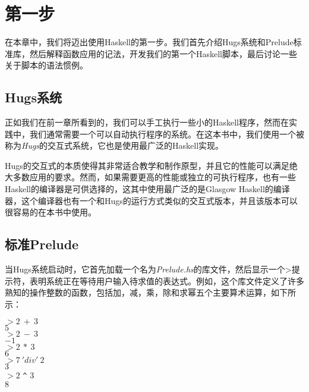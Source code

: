 \chapter{第一步}

在本章中，我们将迈出使用Haskell的第一步。我们首先介绍Hugs系统和Prelude标准库，然后解释函数应用的记法，开发我们的第一个Haskell脚本，最后讨论一些关于脚本的语法惯例。

\section{Hugs系统}
正如我们在前一章所看到的，我们可以手工执行一些小的Haskell程序，然而在实践中，我们通常需要一个可以自动执行程序的系统。在这本书中，我们使用一个被称为\textit{Hugs}的交互式系统，它也是使用最广泛的Haskell实现。

Hugs的交互式的本质使得其非常适合教学和制作原型，并且它的性能可以满足绝大多数应用的要求。然而，如果需要更高的性能或独立的可执行程序，也有一些Haskell的编译器是可供选择的，这其中使用最广泛的是Glasgow
Haskell的编译器，这个编译器也有一个和Hugs的运行方式类似的交互式版本，并且该版本可以很容易的在本书中使用。

\section{标准Prelude}

当Hugs系统启动时，它首先加载一个名为\textit{Prelude.hs}的库文件，然后显示一个>提示符，表明系统正在等待用户输入待求值的表达式。例如，这个库文件定义了许多熟知的操作整数的函数，包括加，减，乘，除和求幂五个主要算术运算，如下所示：

\noindent\hspace*{1cm} $>2~+~3$\\
\hspace*{1cm} $5$\\
\hspace*{1cm} $> 2~-~3$\\
\hspace*{1cm} $-1$\\
\hspace*{1cm} $> 2~*~3$\\
\hspace*{1cm} $6$\\
\hspace*{1cm} $> 7~'div'~2$\\
\hspace*{1cm} $3$\\
\hspace*{1cm} $> 2$ \verb|^| $3$\\
\hspace*{1cm} $8$

